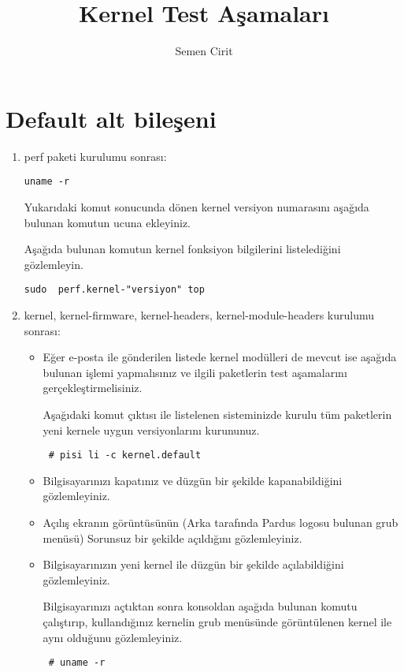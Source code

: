 \documentclass[a4paper,10pt]{article}
\title{Kernel Test Aşamaları}
\author{Semen Cirit}
\begin{document}
\maketitle

\section{Default alt bileşeni}
\begin{enumerate}
\item perf paketi kurulumu sonrası:

\begin{verbatim}
uname -r  
\end{verbatim}

Yukarıdaki komut sonucunda dönen kernel versiyon numarasını aşağıda bulunan komutun ucuna ekleyiniz.

Aşağıda bulunan komutun kernel fonksiyon bilgilerini listelediğini gözlemleyin.
\begin{verbatim}
sudo  perf.kernel-"versiyon" top 
\end{verbatim} 


\item kernel, kernel-firmware, kernel-headers, kernel-module-headers kurulumu sonrası:

\begin{itemize}
\item Eğer e-posta ile gönderilen listede kernel modülleri de mevcut ise aşağıda bulunan işlemi yapmalısınız ve ilgili paketlerin test aşamalarını gerçekleştirmelisiniz.

Aşağıdaki komut çıktısı ile listelenen sisteminizde kurulu tüm paketlerin yeni kernele uygun versiyonlarını kurununuz.
\begin{verbatim}
 # pisi li -c kernel.default
\end{verbatim}

\item Bilgisayarınızı kapatınız ve düzgün bir şekilde kapanabildiğini gözlemleyiniz.
\item Açılış ekranın görüntüsünün (Arka tarafında Pardus logosu bulunan grub menüsü) Sorunsuz bir şekilde açıldığını gözlemleyiniz.
\item Bilgisayarınızın yeni kernel ile düzgün bir şekilde açılabildiğini gözlemleyiniz.

Bilgisayarınızı açtıktan sonra konsoldan aşağıda bulunan komutu çalıştırıp, kullandığınız kernelin grub menüsünde görüntülenen kernel ile aynı olduğunu gözlemleyiniz.
\begin{verbatim}
 # uname -r 
\end{verbatim}


\end{itemize}
\end{enumerate}
\end{document}
